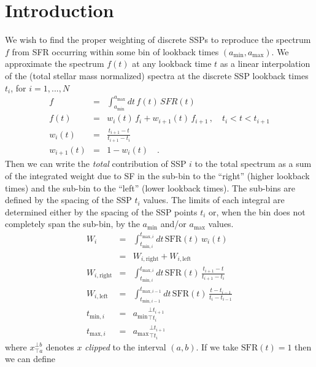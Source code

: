 \documentclass[12pt, letterpaper, preprint]{aastex}
\newcommand{\tmin}[1][]{t_{\mathrm{min} #1}}
\newcommand{\tmax}[1][]{t_{\mathrm{max} #1}}
\newcommand{\amin}{a_{\mathrm{min}}}
\newcommand{\amax} {a_{\mathrm{max}}}
\newcommand{\tintegral}{\int_{\tmin[,i]}^{\tmax[,i]} dt}
\newcommand{\clip}[3][]{{#1}_{\top {#2}}^{\bot {#3}}}
\begin{document}
\author{B. Johnson}


\section{Introduction}
We wish to find the proper weighting of discrete SSPs to reproduce the spectrum $f$ from SFR occurring within some bin of  lookback times $(\amin, \amax)$.
We approximate the spectrum $f(t)$ at any lookback time $t$ as a linear interpolation of the (total stellar mass normalized) spectra at the discrete SSP lookback times $t_i$, for $i=1,...,N$ 
\begin{eqnarray}
f & = & \int_{\amin}^{\amax} dt \, f(t) \, SFR(t) \nonumber \\
f(t) & = & w_{i}(t) \, f_i + w_{i+1}(t) \, f_{i+1} \, , \quad t_i < t < t_{i+1}  \nonumber \\
w_{i}(t) & = & \frac{t_{i+1} - t}{t_{i+1}  - t_i} \nonumber \\
w_{i+1}(t) & = & 1 - w_i(t) \quad . \nonumber
\end{eqnarray}
Then we can write the \emph{total} contribution of SSP $i$ to the total spectrum as a sum of the integrated weight due to SF in the sub-bin to the ``right'' (higher lookback times) and the  sub-bin to the ``left'' (lower lookback times).
The sub-bins are defined by the spacing of the SSP $t_i$ values. 
The limits of each integral are determined either by the spacing of the SSP points $t_i$ or, when the bin does not completely span the sub-bin, by the $\amin$ and/or $\amax$ values.
\begin{eqnarray}
W_i & = &  \tintegral \, \mathrm{SFR}(t) \, w_i(t) \nonumber \\
 & = & W_{i, \mathrm{right}} + W_{i, \mathrm{left}} \nonumber \\
W_{i, \mathrm{right}} & = & \tintegral \, \mathrm{SFR}(t) \, \frac{t_{i+1} - t}{t_{i+1}  - t_i} \nonumber \\
W_{i, \mathrm{left}} & = & \int_{\tmin[,i-1]}^{\tmax[,i-1]} dt \, \mathrm{SFR}(t) \, \frac{t - t_{i-1}}{t_{i}  - t_{i-1}} \nonumber \\
\tmin[,i] & = & \clip[\amin]{t_i}{t_{i+1}} \nonumber \\
\tmax[,i] & = & \clip[\amax]{t_i}{t_{i+1}} \nonumber
\end{eqnarray}
where $\clip[x]{a}{b}$ denotes $x$ \emph{clipped} to the interval $(a,b)$. If we take $\mathrm{SFR}(t) = 1$ then we can define
\end{document}
